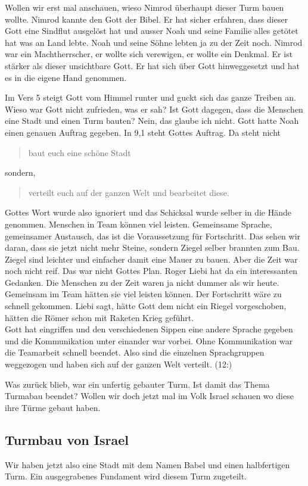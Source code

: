 \documentclass[14pt]{../../inc/mybib}
\newcommand{\q}[1]{\blockquote{#1}}
\begin{document}
    Wollen wir erst mal anschauen, wieso Nimrod überhaupt dieser Turm bauen wollte. Nimrod kannte den Gott der Bibel. Er hat sicher erfahren, dass dieser Gott eine Sindflut ausgelöst hat und ausser Noah und seine Familie alles getötet hat was an Land lebte. Noah und seine Söhne lebten ja zu der Zeit noch. Nimrod war ein Machtherrscher, er wollte sich verewigen, er wollte ein Denkmal. Er ist stärker als dieser unsichtbare Gott. Er hat sich über Gott hinweggesetzt und hat es in die eigene Hand genommen.
    
    Im Vers 5 steigt Gott vom Himmel runter und guckt sich das ganze Treiben an. Wieso war Gott nicht zufrieden, was er sah? Ist Gott dagegen, dass die Menschen eine Stadt und einen Turm bauten? Nein, das glaube ich nicht. Gott hatte Noah einen genauen Auftrag gegeben. In 9,1 steht Gottes Auftrag. Da steht nicht \q{baut euch eine schöne Stadt} sondern, \q{verteilt euch auf der ganzen Welt und bearbeitet diese.} Gottes Wort wurde also ignoriert und das Schicksal wurde selber in die Hände genommen. Menschen in Team können viel leisten. Gemeinsame Sprache, gemeinsamer Austausch, das ist die Voraussetzung für Fortschritt. Das sehen wir daran, dass sie jetzt nicht mehr Steine, sondern Ziegel selber brannten zum Bau. Ziegel sind leichter und einfacher damit eine Mauer zu bauen. Aber die Zeit war noch nicht reif. Das war nicht Gottes Plan. Roger Liebi hat da ein interessanten Gedanken. Die Menschen zu der Zeit waren ja nicht dummer als wir heute. Gemeinsam im Team hätten sie viel leisten können. Der Fortschritt wäre zu schnell gekommen. Liebi sagt, hätte Gott dem nicht ein Riegel vorgeschoben, hätten die Römer schon mit Raketen Krieg geführt.\\
    Gott hat eingriffen und den verschiedenen Sippen eine andere Sprache gegeben und die Kommunikation unter einander war vorbei. Ohne Kommunikation war die Teamarbeit schnell beendet. Also sind die einzelnen Sprachgruppen weggezogen und haben sich auf der ganzen Welt verteilt. (12:)

    Was zurück blieb, war ein unfertig gebauter Turm. Ist damit das Thema Turmabau beendet? Wollen wir doch jetzt mal im Volk Israel schauen wo diese ihre Türme gebaut haben.
    
    \subsection{Turmbau von Israel}
    Wir haben jetzt also eine Stadt mit dem Namen Babel und einen halbfertigen Turm. Ein ausgegrabenes Fundament wird diesem Turm zugeteilt. 
\end{document}
